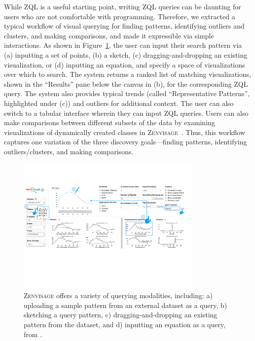 \documentclass[11pt]{article}
\newcommand{\zv}{\textsc{Zenvisage}\xspace}
\begin{document}
\par While ZQL is a useful starting point, writing ZQL
queries can be daunting for users who are not comfortable
with programming.
Therefore, we extracted a typical workflow
of visual querying for finding patterns, identifying
outliers and clusters, and making comparisons, and made it expressible
via simple interactions. As shown in Figure~\ref{fig:modalities}, the user can input their search pattern via (a) inputting a set of points,
(b) a sketch, (c) dragging-and-dropping an existing visualization,
or (d) inputting an equation, 
and specify a space of visualizations over which to search.
The system returns a ranked list of matching visualizations, shown in the ``Results'' pane below the canvas in (b), for the corresponding ZQL query.
The system also provides typical trends 
(called ``Representative Patterns'', highlighted under (c)) and outliers
for additional context. 
The user can also switch to a tabular interface wherein
they can input ZQL queries.  
Users can also make comparisons between different 
subsets of the data by examining visualizations 
of dynamically created classes in \zv~\cite{Lee2017}.
Thus, this workflow captures one variation of the three
discovery goals---finding patterns, identifying outliers/clusters,
and making comparisons. 
\begin{figure}[!t]
\centering
\vspace{-10pt}
\includegraphics[width=0.8\textwidth,frame]{figs/modalities.pdf}
\caption{\zv offers a variety of querying modalities, including: a) uploading a sample pattern from an external dataset as a query, b) sketching a query pattern, c) dragging-and-dropping an existing pattern from the dataset, and d) inputting an equation as a query, from \cite{Lee2017}.}
\label{fig:modalities}
\vspace{-10pt}
\end{figure}
\end{document}
